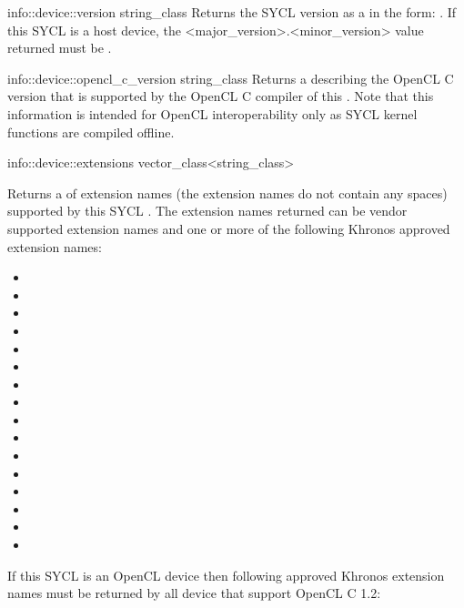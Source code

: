   \addInfoRow
  {info::device::version}
  {string_class}
  {
   Returns the SYCL version as a  in the form:
  .
  If this SYCL  is a host device, the <major_version>.<minor_version> value returned must be .
  }
  
  \addInfoRow
  {info::device::opencl_c_version}
  {string_class}
  {
      Returns a  describing the OpenCL C version that is supported by the OpenCL C compiler of this .
      Note that this information is intended for OpenCL interoperability only as SYCL kernel functions are compiled offline.
    }

  \addInfoRow
  {info::device::extensions}
  {vector_class<string_class>}
  {
         Returns a  of extension names (the extension names
         do not contain any spaces) supported by this SYCL . The extension names returned can be vendor supported extension names and one or more of the following Khronos approved extension names:
  \begin{itemize}
    \item {}
    \item {}
    \item {}
    \item {}
    \item {}
    \item {}
    \item {}
    \item {}
    \item {}
    \item {}
    \item {}
    \item {}
    \item {}
    \item {}
    \item {}
    \item {}
  \end{itemize}
  If this SYCL  is an OpenCL device then following approved Khronos extension names must be returned by all device that support OpenCL C 1.2:
}
